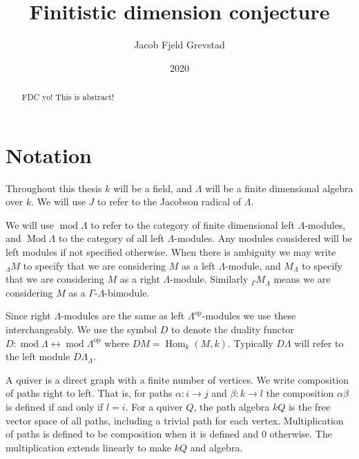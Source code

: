 \documentclass[11pt, a4paper, english]{article}
\theoremstyle{definition}
\DeclareMathOperator{\Hom}{Hom}
\DeclareMathOperator{\op}{op}
\DeclareMathOperator{\Mod}{Mod}
\def\mod{\operatorname{mod}}
\begin{document}
\title{Finitistic dimension conjecture}
\author{Jacob Fjeld Grevstad}
\date{2020}
\maketitle
{}

\begin{abstract}
FDC yo! This is abstract!
\end{abstract}
\clearpage

\tableofcontents
\clearpage

\section*{Notation}
%

Throughout this thesis $k$ will be a field, and $\Lambda$ will be a finite dimensional algebra over $k$. We will use $J$ to refer to the Jacobson radical of $\Lambda$.


We will use $\mod\Lambda$ to refer to the category of finite dimensional left $\Lambda$-modules, and $\Mod\Lambda$ to the category of all left $\Lambda$-modules. Any modules considered will be left modules if not specified otherwise. When there is ambiguity we may write $_\Lambda M$ to specify that we are considering $M$ as a left $\Lambda$-module, and $M_\Lambda$ to specify that we are considering $M$ as a right $\Lambda$-module. Similarly $_\Gamma M_\Lambda$ means we are considering $M$ as a $\Gamma$-$\Lambda$-bimodule.


Since right $\Lambda$-modules are the same as left $\Lambda^{\op}$-modules we use these interchangeably. We use the symbol $D$ to denote the duality functor $D\colon \mod \Lambda \leftrightarrow \mod\Lambda^{\operatorname{op}}$ where $DM = \Hom_k(M, k)$. Typically $D\Lambda$ will refer to the left module $D\Lambda_\Lambda$.


A quiver is a direct graph with a finite number of vertices. We write composition of paths right to left. That is, for paths $\alpha\colon i \to j$ and $\beta\colon k\to l$ the composition $\alpha\beta$ is defined if and only if $l=i$. For a quiver $Q$, the path algebra $kQ$ is the free vector space of all paths, including a trivial path for each vertex. Multiplication of paths is defined to be composition when it is defined and 0 otherwise. The multiplication extends linearly to make $kQ$ and algebra.
\end{document}
